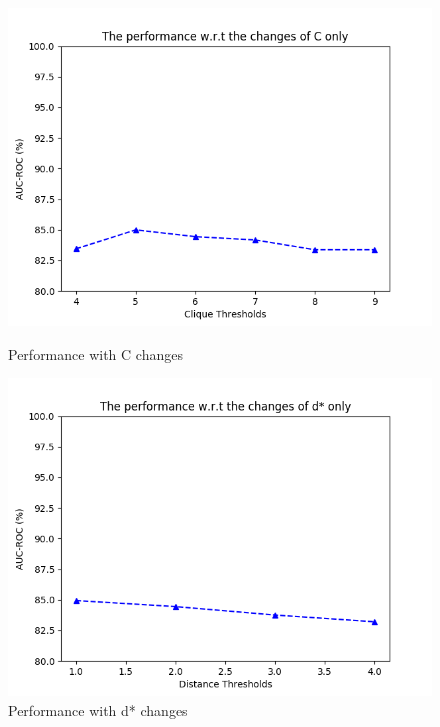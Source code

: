 \documentclass[review]{elsarticle}
\begin{document}
\newpage
\begin{figure}[!tbp]
  \centering
  \begin{minipage}[b]{0.47\textwidth}
    \includegraphics[width=\textwidth]{cliques.png}
    \caption{Performance with C changes}
    \label{fig:c-change}
  \end{minipage}
  \hfill
  \begin{minipage}[b]{0.47\textwidth}
    \includegraphics[width=\textwidth]{distance.png}
    \caption{Performance with d* changes}
    \label{fig:d-change}
  \end{minipage}
\end{figure}
\end{document}
